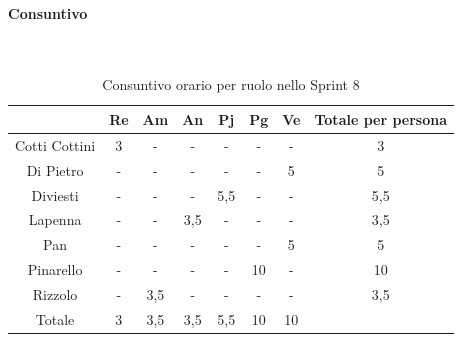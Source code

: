 \documentclass{article}
\begin{document}
                \paragraph{Consuntivo}\mbox{}\\
                \begin{table}[H]
                    \centering
                    \begin{tabular}{|c|c|c|c|c|c|c|c|}
                    \hline
                                    & Re  & Am  & An  & Pj  & Pg  & Ve  & Totale per persona \\ \hline
                    Cotti Cottini & 3   & -   & -   & -   & -   & -   & 3                  \\ \hline
                    Di Pietro     & -   & -   & -   & -   & -   & 5   & 5                  \\ \hline
                    Diviesti      & -   & -   & -   & 5,5 & -   & -   & 5,5                \\ \hline
                    Lapenna       & -   & -   & 3,5 & -   & -   & -   & 3,5                \\ \hline
                    Pan           & -   & -   & -   & -   & -   & 5   & 5                  \\ \hline
                    Pinarello     & -   & -   & -   & -   & 10  & -   & 10                 \\ \hline
                    Rizzolo       & -   & 3,5 & -   & -   & -   & -   & 3,5                \\ \hline
                    Totale        & 3   & 3,5 & 3,5 & 5,5 & 10  & 10  &                    \\ \hline
                    \end{tabular}
                    \caption{Consuntivo orario per ruolo nello Sprint 8}
                \end{table}

\end{document}
